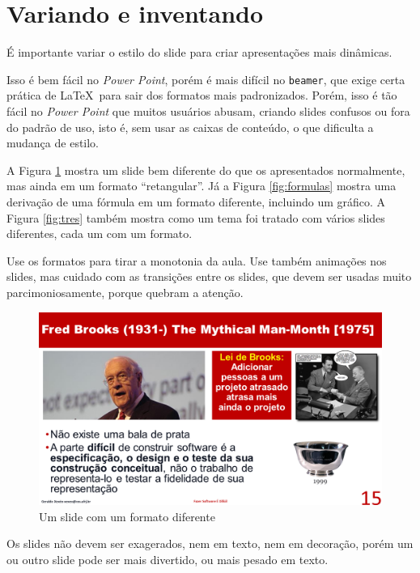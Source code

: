 \section{Variando e inventando}


É importante variar o estilo do slide para criar apresentações mais dinâmicas.

Isso é bem fácil no \textit{Power Point}, porém é mais difícil no \texttt{beamer}, que exige certa prática de \LaTeX\  para sair dos formatos mais padronizados. Porém, isso é tão fácil no \textit{Power Point} que muitos usuários abusam, criando slides confusos ou fora do padrão de uso, isto é, sem usar as caixas de conteúdo, o que dificulta a mudança de estilo.


A Figura \ref{fig:man} mostra um slide bem diferente do que os apresentados normalmente, mas ainda em um formato ``retangular''. Já a Figura \ref{fig:formulas} mostra uma derivação de uma fórmula em um formato diferente, incluindo um gráfico. A Figura \ref{fig:tres} também mostra como um tema foi tratado com vários slides diferentes, cada um com um formato.

Use os formatos para tirar a monotonia da aula. Use também animações nos slides, mas cuidado com as transições entre os slides, que devem ser usadas muito parcimoniosamente, porque quebram a atenção.

\begin{figure}[htb]
    \centering
    \includegraphics[width=\tam\linewidth,frame]{imagens/manmonth.png}
    \caption{Um slide com um formato diferente}
    \label{fig:man}
\end{figure}

Os slides não devem ser exagerados, nem em texto, nem em decoração, porém um ou outro slide pode ser mais divertido, ou mais pesado em texto.


